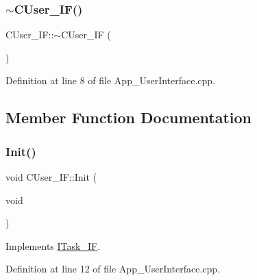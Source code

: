 \mbox{\label{class_c_user___i_f_a35f3408f44d101a06e184311cab14cba}} 
\subsubsection{\texorpdfstring{$\sim$\+C\+User\+\_\+\+I\+F()}{~CUser\_IF()}}
{\footnotesize\ttfamily C\+User\+\_\+\+I\+F\+::$\sim$\+C\+User\+\_\+\+IF (\begin{DoxyParamCaption}{ }\end{DoxyParamCaption})}



Definition at line 8 of file App\+\_\+\+User\+Interface.\+cpp.



\subsection{Member Function Documentation}
\mbox{\label{class_c_user___i_f_a02c8bba754c77583dc5afaa6877dc547}} 
\subsubsection{\texorpdfstring{Init()}{Init()}}
{\footnotesize\ttfamily void C\+User\+\_\+\+I\+F\+::\+Init (\begin{DoxyParamCaption}\item[{void}]{ }\end{DoxyParamCaption})\hspace{0.3cm}{\ttfamily [virtual]}}



Implements \mbox{\hyperlink{class_i_task___i_f_a28f608bdb9b19658403f7b9b7421968d}{I\+Task\+\_\+\+IF}}.



Definition at line 12 of file App\+\_\+\+User\+Interface.\+cpp.

\mbox{\label{class_c_user___i_f_a1be2e11cd5df5ad0fa5a74a0eb283ec5}} 
